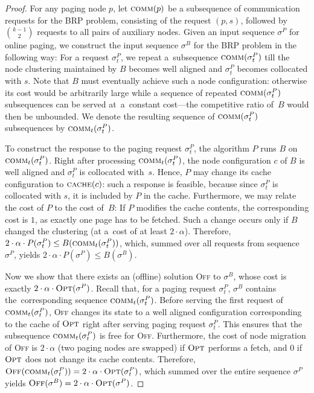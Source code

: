 \documentclass{siamart190516}
\newcommand{\OFF}{\textsc{Off}\xspace}
\newcommand{\OPT}{\textsc{Opt}\xspace}
\newcommand{\comm}{\textsc{comm}}
\begin{document}
\begin{proof}
For any paging node $p$, let $\comm(p)$ be a subsequence of communication
requests for the BRP problem, consisting of the request $(p, s)$, followed by
$\binom{k-1}{2}$ requests to all pairs of auxiliary nodes. Given an input
sequence $\sigma^P$ for online paging, we construct the input sequence
$\sigma^B$ for the BRP problem in the following way: For a request
$\sigma^P_t$, we repeat a~subsequence $\comm(\sigma^P_t)$ till the node
clustering maintained by $B$ becomes well aligned and $\sigma^P_t$ becomes
collocated with $s$. Note that $B$ must eventually achieve such a node
configuration: otherwise its cost would be arbitrarily large while a sequence
of repeated $\comm(\sigma^P_t)$ subsequences can be served at~a~constant
cost---the competitive ratio of~$B$ would then be unbounded. We denote the
resulting sequence of $\comm(\sigma^P_t)$ subsequences by
$\comm_t(\sigma^P_t)$.

To construct the response to the paging request $\sigma^P_t$, the algorithm
$P$ runs $B$ on $\comm_t(\sigma^P_t)$. Right after processing
$\comm_t(\sigma^P_t)$, the node configuration $c$ of $B$ is well aligned and
$\sigma^P_t$ is collocated with~$s$. Hence, $P$ may change its cache
configuration to $\textsc{cache}(c)$: such a response is feasible, because
since $\sigma^P_t$ is collocated with $s$, it is included by $P$ in the cache.
Furthermore, we may relate the cost of $P$ to the cost of~$B$: If $P$ modifies
the cache contents, the corresponding cost is $1$, as exactly one page has to
be fetched. Such a change occurs only if $B$ changed the clustering 
(at a~cost of at least $2 \cdot \alpha$). Therefore, $2
\cdot \alpha \cdot P(\sigma^P_t) \leq B(\comm_t(\sigma^P_t))$, which,
summed over all requests from sequence $\sigma^P$, yields $2 \cdot
\alpha \cdot P(\sigma^P) \leq B(\sigma^B)$.

Now we show that there exists an (offline) solution \OFF to $\sigma^B$, whose
cost is exactly $2 \cdot \alpha \cdot \OPT(\sigma^P)$. Recall that, for a
paging request $\sigma^P_t$, $\sigma^B$ contains the~corresponding sequence
$\comm_t(\sigma^P_t)$. Before serving the first request
of~$\comm_t(\sigma^P_t)$, \OFF changes its state to a well aligned
configuration corresponding to the cache of $\OPT$ right after serving paging
request $\sigma^P_t$. This ensures that the subsequence $\comm_t(\sigma^P_t)$
is free for \OFF. Furthermore, the cost of node migration of \OFF is $2 \cdot
\alpha$ (two paging nodes are swapped) if $\OPT$ performs a fetch, and 0 if
$\OPT$ does not change its cache contents. Therefore,
$\OFF(\comm_t(\sigma^P_t)) = 2 \cdot \alpha \cdot \OPT(\sigma^P_t)$, which
summed over the entire sequence $\sigma^P$ yields $\OFF(\sigma^B) = 2 \cdot
\alpha \cdot \OPT(\sigma^P)$.


\end{proof}
\end{document}
